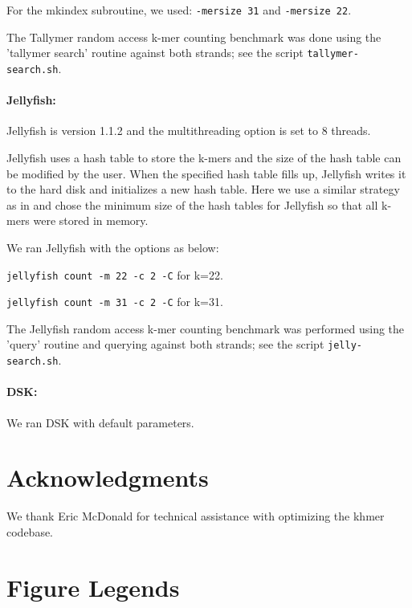 \documentclass[10pt]{article}
\begin{document}
For the mkindex subroutine, we used: {\tt -mersize 31} and {\tt -mersize 22}.

The Tallymer random access k-mer counting benchmark was done using the
'tallymer search' routine against both strands; see the script
{\tt tallymer-search.sh}.

\paragraph{Jellyfish:}
Jellyfish is version 1.1.2 and the multithreading option is set to 8 threads.

Jellyfish uses a hash table to store the k-mers and the size of the
hash table can be modified by the user.  When the specified hash table
fills up, Jellyfish writes it to the hard
disk and initializes a new hash table.  Here we use a
similar strategy as in \cite{Melsted2011} and chose the minimum size of the hash 
tables for Jellyfish so that all k-mers were stored in memory.

We ran Jellyfish with the options as below:

{\tt jellyfish count -m 22 -c 2 -C} for k=22.

{\tt jellyfish count -m 31 -c 2 -C} for k=31.

The Jellyfish random access k-mer counting benchmark was performed
using the 'query' routine and querying against both strands; see
the script {\tt jelly-search.sh}.

\paragraph{DSK:} We ran DSK with default parameters.


\section*{Acknowledgments}

We thank Eric McDonald for technical assistance with optimizing the khmer codebase.


%



\clearpage

\section*{Figure Legends}
\end{document}
